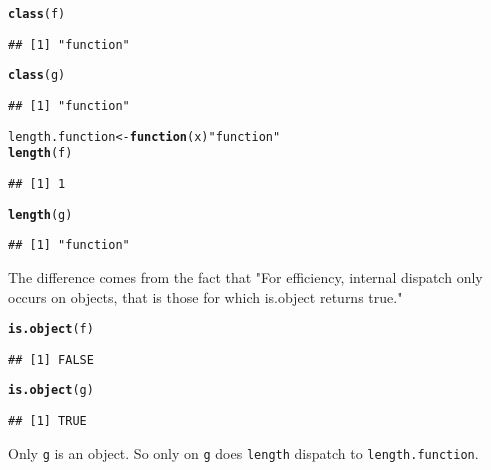 \documentclass{article}\usepackage[]{graphicx}\usepackage[]{color}
\makeatletter
\newcommand{\hlstr}[1]{\textcolor[rgb]{0.192,0.494,0.8}{#1}}%
\newcommand{\hlstd}[1]{\textcolor[rgb]{0.345,0.345,0.345}{#1}}%
\newcommand{\hlkwa}[1]{\textcolor[rgb]{0.161,0.373,0.58}{\textbf{#1}}}%
\newcommand{\hlkwb}[1]{\textcolor[rgb]{0.69,0.353,0.396}{#1}}%
\newcommand{\hlkwc}[1]{\textcolor[rgb]{0.333,0.667,0.333}{#1}}%
\newcommand{\hlkwd}[1]{\textcolor[rgb]{0.737,0.353,0.396}{\textbf{#1}}}%
\newenvironment{kframe}{%
 \def\at@end@of@kframe{}%
 \ifinner\ifhmode%
  \def\at@end@of@kframe{\end{minipage}}%
  \begin{minipage}{\columnwidth}%
 \fi\fi%
 \def\FrameCommand##1{\hskip\@totalleftmargin \hskip-\fboxsep
 \colorbox{shadecolor}{##1}\hskip-\fboxsep
     \hskip-\linewidth \hskip-\@totalleftmargin \hskip\columnwidth}%
 \MakeFramed {\advance\hsize-\width
   \@totalleftmargin\z@ \linewidth\hsize
   \@setminipage}}%
 {\par\unskip\endMakeFramed%
 \at@end@of@kframe}
\newenvironment{knitrout}{}{} %
\makeatother
\begin{document}
\begin{enumerate}
\begin{knitrout}
\begin{kframe}
\begin{alltt}
\hlkwd{class}\hlstd{(f)}
\end{alltt}
\begin{verbatim}
## [1] "function"
\end{verbatim}
\begin{alltt}
\hlkwd{class}\hlstd{(g)}
\end{alltt}
\begin{verbatim}
## [1] "function"
\end{verbatim}
\begin{alltt}
\hlstd{length.function} \hlkwb{<-} \hlkwa{function}\hlstd{(}\hlkwc{x}\hlstd{)} \hlstr{"function"}
\hlkwd{length}\hlstd{(f)}
\end{alltt}
\begin{verbatim}
## [1] 1
\end{verbatim}
\begin{alltt}
\hlkwd{length}\hlstd{(g)}
\end{alltt}
\begin{verbatim}
## [1] "function"
\end{verbatim}
\end{kframe}
\end{knitrout}

The difference comes from the fact that "For efficiency, internal dispatch only occurs on objects, that is those for which is.object returns true."

\begin{knitrout}
\color{fgcolor}\begin{kframe}
\begin{alltt}
\hlkwd{is.object}\hlstd{(f)}
\end{alltt}
\begin{verbatim}
## [1] FALSE
\end{verbatim}
\begin{alltt}
\hlkwd{is.object}\hlstd{(g)}
\end{alltt}
\begin{verbatim}
## [1] TRUE
\end{verbatim}
\end{kframe}
\end{knitrout}

Only \verb`g` is an object. So only on \verb`g` does \verb`length` dispatch to \verb`length.function`.

\end{enumerate}
\end{document}

